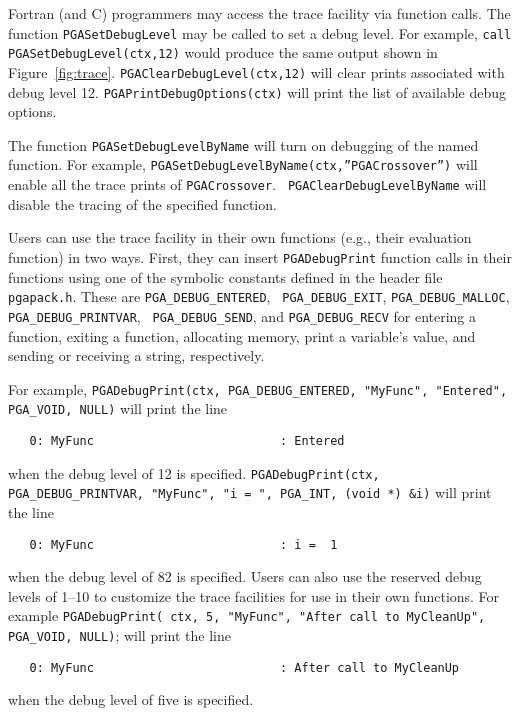 \documentclass{report}
\begin{document}
\begin{sloppypar}
Fortran (and C) programmers may access the trace facility via function calls.
The function {\tt PGASetDebugLevel} may be called to set a debug level.  For
example, {\tt call PGASetDebugLevel(ctx,12)} would produce the same output
shown in Figure~\ref{fig:trace}.  {\tt PGAClearDebugLevel(ctx,12)} will clear
prints associated with debug level 12.  {\tt PGAPrintDebugOptions(ctx)} will
print the list of available debug options.
\end{sloppypar}

The function {\tt PGASetDebugLevelByName} will turn on debugging of the named
function.  For example, {\tt PGASetDebugLevelByName(ctx,''PGACrossover'')}
will enable all the trace prints of {\tt PGACrossover}.  {\tt
PGAClearDebugLevelByName} will disable the tracing of the specified function.


Users can use the trace facility in their own functions (e.g., their
evaluation function) in two ways.  First, they can insert {\tt PGADebugPrint}
function calls in their functions using one of the symbolic constants defined
in the header file {\tt pgapack.h}.  These are {\tt PGA\_DEBUG\_ENTERED}, {\tt
PGA\_DEBUG\_EXIT}, {\tt PGA\_DEBUG\_MALLOC}, {\tt PGA\_DEBUG\_PRINTVAR}, {\tt
PGA\_DEBUG\_SEND}, and {\tt PGA\_DEBUG\_RECV} for entering a function, exiting
a function, allocating memory, print a variable's value, and sending or
receiving a string, respectively.

\begin{sloppypar}
For example, {\tt PGADebugPrint(ctx,
PGA\_DEBUG\_ENTERED, "MyFunc", "Entered", PGA\_VOID, NULL)} will print the
line
\end{sloppypar}

\begin{verbatim}
   0: MyFunc                          : Entered
\end{verbatim}

when the debug level of 12 is specified.  {\tt PGADebugPrint(ctx,
PGA\_DEBUG\_PRINTVAR, "MyFunc", "i = ", PGA\_INT, (void *) \&i)} will print the
line
\begin{verbatim}
   0: MyFunc                          : i =  1
\end{verbatim}
when the debug level of 82 is specified.  Users can also use the reserved
debug levels of 1--10 to customize the trace facilities for use in their own
functions.  For example {\tt PGADebugPrint( ctx, 5, "MyFunc", "After call to
MyCleanUp", PGA\_VOID, NULL)}; will print the line
\begin{verbatim}
   0: MyFunc                          : After call to MyCleanUp
\end{verbatim}
when the debug level of five is specified.
\end{document}
